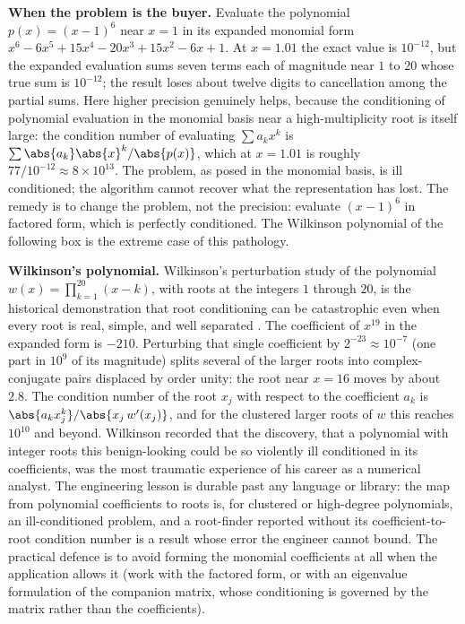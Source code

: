 \begin{example}
\textbf{When the problem is the buyer.} Evaluate the polynomial
$p(x) = (x - 1)^{6}$ near $x = 1$ in its expanded monomial form
$x^{6} - 6x^{5} + 15x^{4} - 20x^{3} + 15x^{2} - 6x + 1$. At
$x = 1.01$ the exact value is $10^{-12}$, but the expanded
evaluation sums seven terms each of magnitude near $1$ to $20$ whose
true sum is $10^{-12}$; the result loses about twelve digits to
cancellation among the partial sums. Here higher precision genuinely
helps, because the conditioning of polynomial evaluation in the
monomial basis near a high-multiplicity root is itself large: the
condition number of evaluating $\sum a_k x^k$ is $\sum \abs{a_k}
\abs{x}^k / \abs{p(x)}$, which at $x = 1.01$ is roughly $77 /
10^{-12} \approx 8 \times 10^{13}$. The problem, as posed in the
monomial basis, is ill conditioned; the algorithm cannot recover
what the representation has lost. The remedy is to change the
problem, not the precision: evaluate $(x - 1)^{6}$ in factored form,
which is perfectly conditioned. The Wilkinson polynomial of the
following box is the extreme case of this pathology.
\end{example}

\begin{mastery}
\textbf{Wilkinson's polynomial.} Wilkinson's perturbation study of
the polynomial $w(x) = \prod_{k=1}^{20}(x - k)$, with roots at the
integers $1$ through $20$, is the historical demonstration that root
conditioning can be catastrophic even when every root is real,
simple, and well separated \cite[ch.~2]{text:v2ch16-wilkinson-1965}.
The coefficient of $x^{19}$ in the expanded form is $-210$.
Perturbing that single coefficient by $2^{-23} \approx 10^{-7}$ (one
part in $10^{9}$ of its magnitude) splits several of the larger
roots into complex-conjugate pairs displaced by order unity: the
root near $x = 16$ moves by about $2.8$. The condition number of the
root $x_j$ with respect to the coefficient $a_k$ is
$\abs{a_k x_j^{k}} / \abs{x_j \, w'(x_j)}$, and for the clustered
larger roots of $w$ this reaches $10^{10}$ and beyond. Wilkinson
recorded that the discovery, that a polynomial with integer roots
this benign-looking could be so violently ill conditioned in its
coefficients, was the most traumatic experience of his career as a
numerical analyst. The engineering lesson is durable past any
language or library: the map from polynomial coefficients to roots
is, for clustered or high-degree polynomials, an ill-conditioned
problem, and a root-finder reported without its coefficient-to-root
condition number is a result whose error the engineer cannot bound.
The practical defence is to avoid forming the monomial coefficients
at all when the application allows it (work with the factored form,
or with an eigenvalue formulation of the companion matrix, whose
conditioning is governed by the matrix rather than the
coefficients).
\end{mastery}

